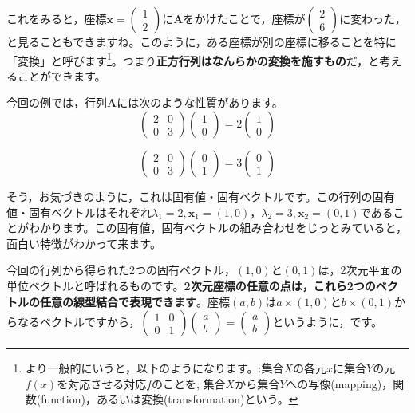 \documentclass{ltjsbook}
\begin{document}
これをみると，座標$\bm{x}=\begin{pmatrix}1\\2\end{pmatrix}$に$\bm{A}$をかけたことで，座標が$\begin{pmatrix}2\\6\end{pmatrix}$に変わった，と見ることもできますね。このように，ある座標が別の座標に移ることを特に「変換」と呼びます\footnote{より一般的にいうと，以下のようになります。:集合$X$の各元$x$に集合$Y$の元$f(x)$を対応させる対応$f$のことを, 集合$X$から集合$Y$への写像(mapping)，関数(function)，あるいは変換(transformation)という。}。つまり\textbf{正方行列はなんらかの変換を施すもの}だ，と考えることができます。

今回の例では，行列$\bm{A}$には次のような性質があります。
\begin{equation}
\begin{pmatrix}
2 & 0\\
0 & 3
\end{pmatrix}
\begin{pmatrix}
1 \\
0 
\end{pmatrix} 
= 2 \begin{pmatrix} 1 \\ 0 \end{pmatrix}
\end{equation}

\begin{equation}
\begin{pmatrix} 2 & 0\\ 0 & 3 \end{pmatrix} \begin{pmatrix} 0 \\ 1 \end{pmatrix} 
= 3 \begin{pmatrix} 0 \\ 1 \end{pmatrix}
\end{equation}

そう，お気づきのように，これは固有値・固有ベクトルです。この行列の固有値・固有ベクトルはそれぞれ$\lambda_1=2,\bm{x}_1=(1,0)$，$\lambda_2=3,\bm{x}_2=(0,1)$であることがわかります。この固有値，固有ベクトルの組み合わせをじっとみていると，面白い特徴がわかって来ます。

今回の行列から得られた2つの固有ベクトル，$(1,0)$と$(0,1)$は，2次元平面の単位ベクトルと呼ばれるものです。\textbf{2次元座標の任意の点は，これら2つのベクトルの任意の線型結合で表現できます}。座標$(a,b)$は$a\times(1,0)$と$b\times(0,1)$からなるベクトルですから，$\begin{pmatrix}1 & 0\\0 & 1\end{pmatrix}\begin{pmatrix}a\\b\end{pmatrix}=\begin{pmatrix}a\\b\end{pmatrix}$というように，です。
\end{document}
